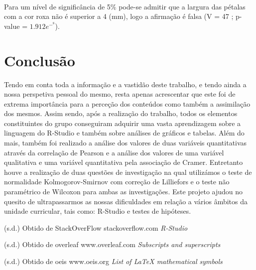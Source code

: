 \documentclass{article}
\begin{document}
\paragraph{}Para um nível de significância de 5$\%$ pode-se admitir que a largura das pétalas com a cor roxa não é superior a 4 (mm), logo a afirmação é falsa (V = 47 ; p-value = \begin{math}1.912e^-^8\end{math}).
 

 
\section{Conclusão}

Tendo em conta toda a informação e a vastidão deste trabalho, e tendo ainda a nossa perspetiva pessoal do mesmo, resta apenas acrescentar que este foi de extrema importância para a perceção dos conteúdos como também a assimilação dos mesmos. Assim sendo, após a realização do trabalho, todos os elementos constituintes do grupo conseguiram adquirir uma vasta aprendizagem sobre a linguagem do R-Studio e também sobre análises de gráficos e tabelas. Além do mais, também foi realizado a análise dos valores de duas variáveis quantitativas através da correlação de Pearson e a análise dos valores de uma variável qualitativa e uma variável quantitativa pela associação de Cramer. Entretanto houve a realização de duas questões de investigação na qual utilizámos o teste de normalidade Kolmogorov-Smirnov com correção de Lilliefors e o teste não paramétrico de Wilcoxon para ambas as investigações. Este projeto ajudou no quesito de ultrapassarmos as nossas dificuldades em relação a vários âmbitos da unidade curricular, tais como: R-Studio e testes de hipóteses. 


    
    \begin{thebibliography}{}
    
    (s.d.) Obtido de StackOverFlow stackoverflow.com
    \textit{R-Studio}
    
   (s.d.) Obtido de overleaf www.overleaf.com \textit{Subscripts and superscripts}
   
   (s.d.) Obtido de oeis www.oeis.org \textit{List of LaTeX mathematical symbols}
    
    
    \end{thebibliography}
\end{document}
